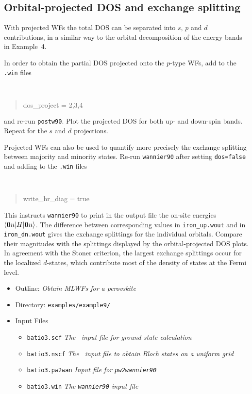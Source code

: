 \documentclass[a4paper,11pt,twoside]{article}
\begin{document}
\subsection*{Orbital-projected DOS and exchange splitting}

With projected WFs the total DOS can be separated into $s$, $p$ and
$d$ contributions, in a similar way to the orbital decomposition of
the energy bands in Example~4.
  
In order to obtain the partial DOS projected onto the $p$-type WFs,
add to the {\tt .win} files
%
{\tt
\begin{quote}
dos\_project = 2,3,4
\end{quote}
}
%
and re-run {\tt postw90}. Plot the projected DOS for both up- and
down-spin bands. Repeat for the $s$ and $d$ projections. 

Projected WFs can also be used to quantify more precisely the exchange
splitting between majority and minority states. Re-run {\tt wannier90}
after setting {\tt dos=false} and adding to the {\tt .win} files
%
{\tt
\begin{quote}
write\_hr\_diag = true
\end{quote}
}
%
This instructs {\tt wannier90} to print in the output file the on-site
energies $\langle {\bf 0}n\vert H\vert {\bf 0}n\rangle$. The
difference between corresponding values in {\tt iron\_up.wout} and in
{\tt iron\_dn.wout} gives the exchange splittings for the individual
orbitals. Compare their magnitudes with the splittings displayed by
the orbital-projected DOS plots.  In agreement with the Stoner
criterion, the largest exchange splittings occur for the localized
$d$-states, which contribute most of the density of states at the
Fermi level.




\begin{itemize}
\item{Outline: \it{Obtain MLWFs for a perovskite}}
\item{Directory: {\tt examples/example9/}}
\item{Input Files}
\begin{itemize}
\item{ {\tt batio3.scf}  {\it The \pwscf\ input file for ground state
    calculation}} 
\item{ {\tt batio3.nscf}  {\it The \pwscf\ input file to obtain Bloch states
    on a uniform grid}} 
\item{ {\tt batio3.pw2wan}  {\it Input file for {\tt pw2wannier90}}}
\item{ {\tt  batio3.win}  {\it The {\tt wannier90} input file}}
\end{itemize}
\end{itemize}
\end{document}
